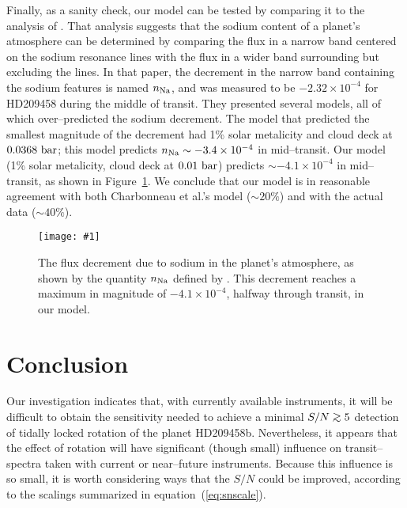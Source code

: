 \documentclass[12pt,preprint]{aastex}
\def\plotone#1{\centering \leavevmode
\texttt{[image: \#1]}}
\def\gsim{\;\rlap{\lower 2.5pt
 \hbox{$\sim$}}\raise 1.5pt\hbox{$>$}\;}
\begin{document}
Finally, as a sanity check, our model can be tested by comparing
it to the analysis of
\citet{charbonneau_et_al2002}.  That analysis suggests that
the sodium content of a planet's atmosphere can be determined
by comparing the flux in a narrow band centered on the sodium
resonance lines with the flux in a wider band surrounding but
excluding the lines.  In that paper, the decrement in the
narrow band containing the sodium features is named $n_{\rm Na}$,
and was measured to be $-2.32\times 10^{-4}$ for HD209458 during
the middle of transit.  They presented several models, all of
which over--predicted the sodium decrement.  The model that
predicted the smallest magnitude of the decrement had 1\% solar
metalicity and cloud deck at $0.0368 {\rm ~bar}$; this model
predicts $n_{\rm Na} \sim -3.4 \times 10^{-4}$ in mid--transit.
Our model (1\% solar metalicity, cloud deck at $0.01 {\rm ~bar}$)
predicts $\sim -4.1 \times 10^{-4}$ in mid--transit, as shown
in Figure~\ref{fig:charbonneau}.  We conclude that our model is in
reasonable agreement with both Charbonneau et al.'s model ($\sim 20\%$)
and with the actual data ($\sim 40\%$).
\begin{figure}[h!]
\plotone
{fig5.eps}
\caption{The flux decrement due to sodium in the planet's atmosphere,
as shown by the quantity $n_{\rm Na}$ defined by \citet{charbonneau_et_al2002}.
This decrement reaches a maximum in magnitude of $-4.1 \times 10^{-4}$,
halfway through transit, in our model.}
\label{fig:charbonneau}
\end{figure}



\section{Conclusion}
\label{sec:conc}
Our investigation indicates that, with currently available instruments,
it will be difficult to obtain the sensitivity needed to achieve a
minimal $S/N \gsim 5$ detection of tidally locked rotation of the
planet HD209458b.  Nevertheless, it appears that the effect of rotation
will have significant (though small) influence on transit--spectra taken with
current or near--future instruments.
Because this influence is so small, it is worth considering ways that the
$S/N$ could be improved, according to the scalings summarized in
equation~(\ref{eq:snscale}).
\end{document}

